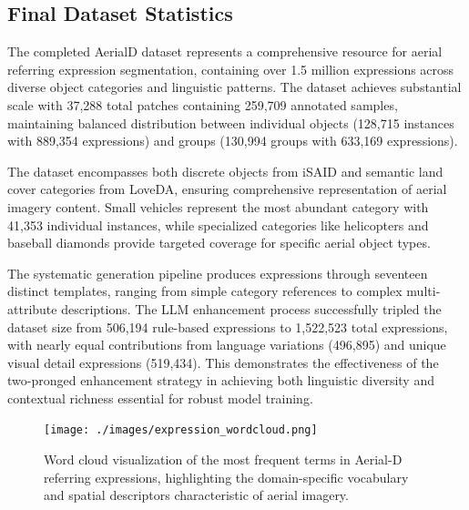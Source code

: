 \subsection{Final Dataset Statistics}

The completed AerialD dataset represents a comprehensive resource for aerial referring expression segmentation, containing over 1.5 million expressions across diverse object categories and linguistic patterns. The dataset achieves substantial scale with 37,288 total patches containing 259,709 annotated samples, maintaining balanced distribution between individual objects (128,715 instances with 889,354 expressions) and groups (130,994 groups with 633,169 expressions).

The dataset encompasses both discrete objects from iSAID and semantic land cover categories from LoveDA, ensuring comprehensive representation of aerial imagery content. Small vehicles represent the most abundant category with 41,353 individual instances, while specialized categories like helicopters and baseball diamonds provide targeted coverage for specific aerial object types.

The systematic generation pipeline produces expressions through seventeen distinct templates, ranging from simple category references to complex multi-attribute descriptions. The LLM enhancement process successfully tripled the dataset size from 506,194 rule-based expressions to 1,522,523 total expressions, with nearly equal contributions from language variations (496,895) and unique visual detail expressions (519,434). This demonstrates the effectiveness of the two-pronged enhancement strategy in achieving both linguistic diversity and contextual richness essential for robust model training.

\begin{figure}[H]
\centering
\texttt{[image: ./images/expression\_wordcloud.png]}
\caption{Word cloud visualization of the most frequent terms in Aerial-D referring expressions, highlighting the domain-specific vocabulary and spatial descriptors characteristic of aerial imagery.}
\label{fig:expression_wordcloud}
\end{figure}

